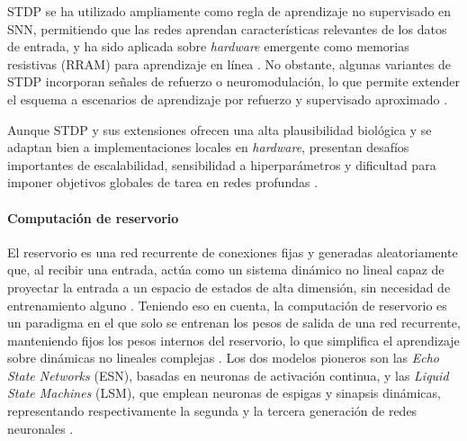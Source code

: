 STDP se ha utilizado ampliamente como regla de aprendizaje no supervisado en SNN, permitiendo que las redes aprendan características relevantes de los datos de entrada, y ha sido aplicada sobre \textit{hardware} emergente como memorias resistivas (RRAM) para aprendizaje en línea \cite{Guo2019rramsnn}. No obstante, algunas variantes de STDP incorporan señales de refuerzo o neuromodulación, lo que permite extender el esquema a escenarios de aprendizaje por refuerzo y supervisado aproximado \cite{RAHMAN2025stdp}.



Aunque STDP y sus extensiones ofrecen una alta plausibilidad biológica y se adaptan bien a implementaciones locales en \textit{hardware}, presentan desafíos importantes de escalabilidad, sensibilidad a hiperparámetros y dificultad para imponer objetivos globales de tarea en redes profundas \cite{Saranirad2022stdp, RAHMAN2025stdp}.

\paragraph{Computación de reservorio}
El reservorio es una red recurrente de conexiones fijas y generadas aleatoriamente que, al recibir una entrada, actúa como un sistema dinámico no lineal capaz de proyectar la entrada a un espacio de estados de alta dimensión, sin necesidad de entrenamiento alguno \cite{LUKOSEVICIUS2009reservoir}. Teniendo eso en cuenta, la computación de reservorio es un paradigma en el que solo se entrenan los pesos de salida de una red recurrente, manteniendo fijos los pesos internos del reservorio, lo que simplifica el aprendizaje sobre dinámicas no lineales complejas \cite{LUKOSEVICIUS2009reservoir}. Los dos modelos pioneros son las \textit{Echo State Networks} (ESN), basadas en neuronas de activación continua, y las \textit{Liquid State Machines} (LSM), que emplean neuronas de espigas y sinapsis dinámicas, representando respectivamente la segunda y la tercera generación de redes neuronales \cite{LUKOSEVICIUS2009reservoir}.

